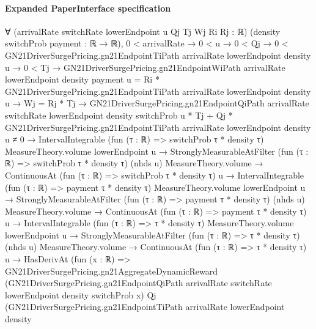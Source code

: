 \documentclass[10pt]{article}
\begin{document}
\paragraph{Expanded PaperInterface specification}
\begin{ReviewVerbatim}
∀ (arrivalRate switchRate lowerEndpoint u Qj Tj Wj Ri Rj : ℝ) (density switchProb payment : ℝ → ℝ),
  0 < arrivalRate →
    0 < u →
      0 < Qj →
        0 < GN21DriverSurgePricing.gn21EndpointTiPath arrivalRate lowerEndpoint density u →
          0 < Tj →
            GN21DriverSurgePricing.gn21EndpointWiPath arrivalRate lowerEndpoint density payment u =
                Ri * GN21DriverSurgePricing.gn21EndpointTiPath arrivalRate lowerEndpoint density u →
              Wj = Rj * Tj →
                GN21DriverSurgePricing.gn21EndpointQiPath arrivalRate switchRate lowerEndpoint density switchProb u *
                        Tj +
                      Qj * GN21DriverSurgePricing.gn21EndpointTiPath arrivalRate lowerEndpoint density u ≠
                    0 →
                  IntervalIntegrable (fun (τ : ℝ) => switchProb τ * density τ) MeasureTheory.volume lowerEndpoint u →
                    StronglyMeasurableAtFilter (fun (τ : ℝ) => switchProb τ * density τ) (nhds u) MeasureTheory.volume →
                      ContinuousAt (fun (τ : ℝ) => switchProb τ * density τ) u →
                        IntervalIntegrable (fun (τ : ℝ) => payment τ * density τ) MeasureTheory.volume lowerEndpoint u →
                          StronglyMeasurableAtFilter (fun (τ : ℝ) => payment τ * density τ) (nhds u)
                              MeasureTheory.volume →
                            ContinuousAt (fun (τ : ℝ) => payment τ * density τ) u →
                              IntervalIntegrable (fun (τ : ℝ) => τ * density τ) MeasureTheory.volume lowerEndpoint u →
                                StronglyMeasurableAtFilter (fun (τ : ℝ) => τ * density τ) (nhds u)
                                    MeasureTheory.volume →
                                  ContinuousAt (fun (τ : ℝ) => τ * density τ) u →
                                    HasDerivAt
                                        (fun (x : ℝ) =>
                                          GN21DriverSurgePricing.gn21AggregateDynamicReward
                                            (GN21DriverSurgePricing.gn21EndpointQiPath arrivalRate switchRate
                                              lowerEndpoint density switchProb x)
                                            Qj
                                            (GN21DriverSurgePricing.gn21EndpointTiPath arrivalRate lowerEndpoint density

\end{ReviewVerbatim}
\end{document}
